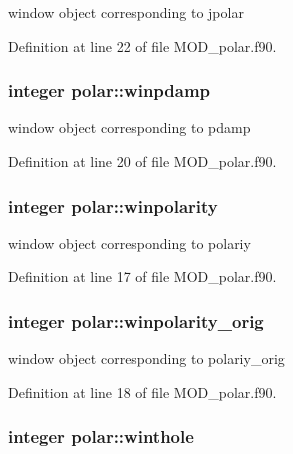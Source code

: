 window object corresponding to jpolar 



Definition at line 22 of file M\-O\-D\-\_\-polar.\-f90.

\hypertarget{classpolar_a4e3cb4e1ba57dc785e0dd710f69356aa}{
\subsubsection[{winpdamp}]{\setlength{\rightskip}{0pt plus 5cm}integer polar\-::winpdamp}}\label{classpolar_a4e3cb4e1ba57dc785e0dd710f69356aa}


window object corresponding to pdamp 



Definition at line 20 of file M\-O\-D\-\_\-polar.\-f90.

\hypertarget{classpolar_a1d19caa1ebe353c09cab00e519cd3c56}{
\subsubsection[{winpolarity}]{\setlength{\rightskip}{0pt plus 5cm}integer polar\-::winpolarity}}\label{classpolar_a1d19caa1ebe353c09cab00e519cd3c56}


window object corresponding to polariy 



Definition at line 17 of file M\-O\-D\-\_\-polar.\-f90.

\hypertarget{classpolar_ad46b7c78e0b9c2c437c0a53dd330bfba}{
\subsubsection[{winpolarity\-\_\-orig}]{\setlength{\rightskip}{0pt plus 5cm}integer polar\-::winpolarity\-\_\-orig}}\label{classpolar_ad46b7c78e0b9c2c437c0a53dd330bfba}


window object corresponding to polariy\-\_\-orig 



Definition at line 18 of file M\-O\-D\-\_\-polar.\-f90.

\hypertarget{classpolar_abab52250380dd4bd332ad37ed36ac192}{
\subsubsection[{winthole}]{\setlength{\rightskip}{0pt plus 5cm}integer polar\-::winthole}}\label{classpolar_abab52250380dd4bd332ad37ed36ac192}


